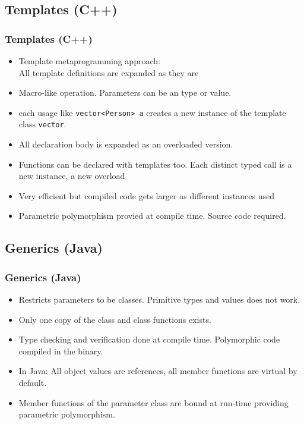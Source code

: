 \subsection{Templates (C++)}
\begin{frame}
\frametitle{Templates (C++)}
\begin{itemize}
\item Template metaprogramming approach:\\
	All template definitions are expanded as they are 
\item Macro-like operation. Parameters can be an type or value.
\item each  usage like \lstinline!vector<Person> a!
	creates a new instance of the template class \lstinline!vector!.
\item All declaration body is expanded as an overloaded version.
\item Functions can be declared with templates too. Each distinct typed call is a new instance, a new overload
\item Very efficient but compiled code gets larger as different instances used
\item Parametric polymorphism provied at compile time. Source code required.
\end{itemize}
\end{frame}

\subsection{Generics (Java)}
\begin{frame}
\frametitle{Generics (Java)}
\begin{itemize}
\item Restricts parameters to be classes. Primitive types and values does not work.
\item Only one copy of the class and class functions exists.
\item Type checking and verification done at compile time. Polymorphic code compiled in the binary.
\item In Java: All object values are references, all member functions are virtual by default.
\item Member functions of the parameter class are bound at run-time 
providing parametric polymorphism.
\end{itemize}
\end{frame}

